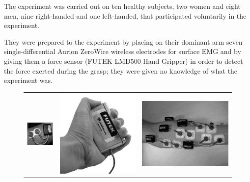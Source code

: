The experiment was carried out on ten healthy subjects, two women and eight men, nine right-handed and one left-handed, that participated voluntarily in the experiment.

They were prepared to the experiment by placing on their dominant arm seven single-differential Aurion ZeroWire wireless electrodes for surface EMG and by giving them a force sensor (FUTEK LMD500 Hand Gripper) in order to detect the force exerted during the grasp; they were given no knowledge of what the experiment was.

\begin{figure}[!t] \centering
  \begin{tabular}{ccc}
   \includegraphics[height=0.16\textheight]{figs/Electrode} &
    \includegraphics[height=0.16\textheight]{figs/Hand_Gripper} &
    \includegraphics[height=0.16\textheight]{figs/El_Arrangement} \\

\end{tabular}
\end{figure}
